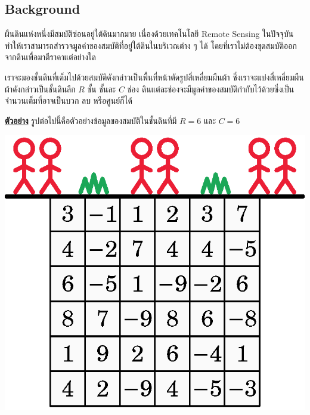 
\subsection*{\sectionfont\upshape Background}

ผืนดินแห่งหนึ่งมีสมบัติซ่อนอยู่ใต้ดินมากมาย เนื่องด้วยเทคโนโลยี Remote Sensing ในปัจจุบัน
ทำให้เราสามารถสำรวจมูลค่าของสมบัติที่อยู่ใต้ดินในบริเวณต่าง ๆ ได้ 
โดยที่เราไม่ต้องขุดสมบัติออกจากดินเพื่อมาตีราคาแต่อย่างใด

เราจะมองชั้นดินที่เต็มไปด้วยสมบัติดังกล่าวเป็นพื้นที่หน้าตัดรูปสี่เหลี่ยมผืนผ้า 
ซึ่งเราจะแบ่งสี่เหลี่ยมผืนผ้าดังกล่าวเป็นชั้นดินลึก $R$ ชั้น ชั้นละ $C$ ช่อง 
ดินแต่ละช่องจะมีมูลค่าของสมบัติกำกับไว้ด้วยซึ่งเป็นจำนวนเต็มที่อาจเป็นบวก ลบ หรือศูนย์ก็ได้

\bigskip\noindent
\textbf{\uline{ตัวอย่าง}} รูปต่อไปนี้คือตัวอย่างข้อมูลของสมบัติในชั้นดินที่มี $R = 6$ และ $C = 6$
\begin{center}
    \includegraphics[scale=0.6]{figures/coding_descendingdrills_01.eps}
\end{center}

